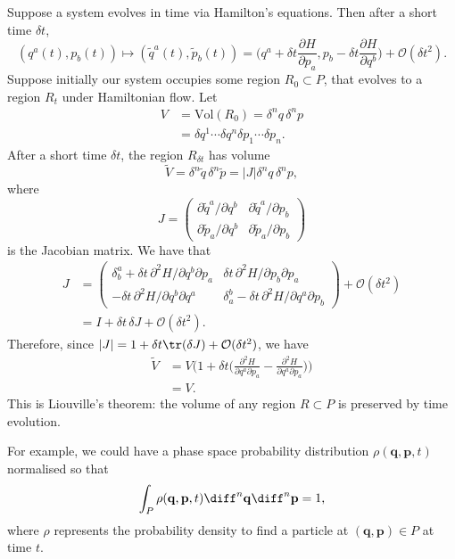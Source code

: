 \documentclass[12pt]{article}
\begin{document}
Suppose a system evolves in time via Hamilton's equations. Then after a short time $\delta t$,
\[
	(q^a(t), p_b(t)) \mapsto (\tilde q^a(t), \tilde p_b(t)) = \biggl( q^a + \delta t \frac{\partial H}{\partial p_a}, p_b - \delta t \frac{\partial H}{\partial q^b} \biggr) + \mathcal{O}(\delta t^2).
\]
Suppose initially our system occupies some region $R_0 \subset P$, that evolves to a region $R_t$ under Hamiltonian flow. Let
\begin{align*}
	V &= \mathrm{Vol}(R_0) = \delta^n q\, \delta^n p \\
	  &= \delta q^1 \cdots \delta q^n \delta p_1 \cdots \delta p_n.
\end{align*}
After a short time $\delta t$, the region $R_{\delta t}$ has volume
\[
\tilde V = \delta^n \tilde q\, \delta^n \tilde p = |J| \delta^n q\, \delta^n p,
\]
where
\[
J =
\begin{pmatrix}
	\partial \tilde q^a/\partial q^b & \partial \tilde q^a/\partial p_b \\
	\partial \tilde p_a/\partial q^b & \partial \tilde p_a/\partial p_b
\end{pmatrix}
\]
is the Jacobian matrix. We have that
\begin{align*}
	J &=
\begin{pmatrix}
	\delta^a_b + \delta t \, \partial^2 H/\partial q^b \partial p_a & \delta t \, \partial^2 H/ \partial p_b \partial p_a \\
	-\delta t \, \partial^2 H/\partial q^b \partial q^a & \delta_a^b - \delta t \, \partial^2 H/\partial q^a \partial p_b
\end{pmatrix}
+ \mathcal{O}(\delta t^2) \\
	  &= I + \delta t \, \delta J + \mathcal{O}(\delta t^2).
\end{align*}
Therefore, since $|J| = 1 + \delta t \tr(\delta J) + \mathcal{O}(\delta t^2)$, we have
\begin{align*}
	\tilde V &= V \biggl(1 + \delta t \biggl( \frac{\partial^2 H}{\partial q^a \partial p_a} - \frac{\partial^2 H}{\partial q^a \partial p_a} \biggr) \biggr) \\
		 &= V.
\end{align*}
This is Liouville's theorem: the volume of any region $R \subset P$ is preserved by time evolution.

For example, we could have a phase space probability distribution $\rho(\mathbf{q}, \mathbf{p}, t)$ normalised so that
\[
\int_P \rho(\mathbf{q}, \mathbf{p}, t) \diff^n \mathbf{q} \diff^n \mathbf{p} = 1,
\]
where $\rho$ represents the probability density to find a particle at $(\mathbf{q}, \mathbf{p}) \in P$ at time $t$.
\end{document}
